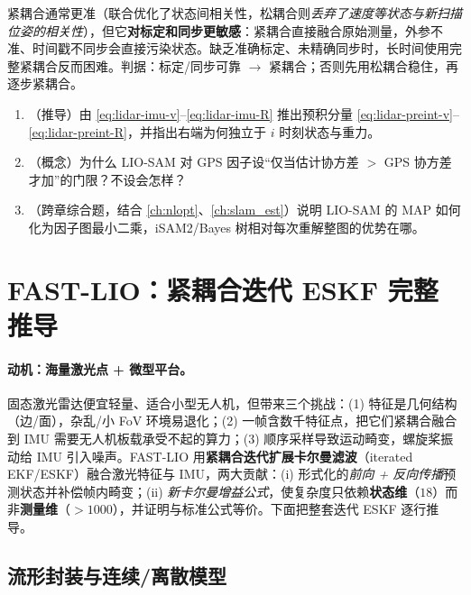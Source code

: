 \begin{pitfall}
紧耦合通常更准（联合优化了状态间相关性，松耦合则\emph{丢弃了速度等状态与新扫描位姿的相关性}），但它\textbf{对标定和同步更敏感}：紧耦合直接融合原始测量，外参不准、时间戳不同步会直接污染状态。缺乏准确标定、未精确同步时，长时间使用完整紧耦合反而困难\cite{carlone2026handbook}。判据：标定/同步可靠 $\to$ 紧耦合；否则先用松耦合稳住，再逐步紧耦合。
\end{pitfall}

\begin{practice}
\begin{enumerate}
  \item （推导）由 \cref{eq:lidar-imu-v}–\cref{eq:lidar-imu-R} 推出预积分量 \cref{eq:lidar-preint-v}–\cref{eq:lidar-preint-R}，并指出右端为何独立于 $i$ 时刻状态与重力。
  \item （概念）为什么 LIO-SAM 对 GPS 因子设“仅当估计协方差 $>$ GPS 协方差才加”的门限？不设会怎样？
  \item （跨章综合题，结合 \cref{ch:nlopt}、\cref{ch:slam_est}）说明 LIO-SAM 的 MAP 如何化为因子图最小二乘，iSAM2/Bayes 树相对每次重解整图的优势在哪。
\end{enumerate}
\end{practice}

\section{FAST-LIO：紧耦合迭代 ESKF 完整推导}
\label{sec:lidar-fastlio}

\paragraph{动机：海量激光点 + 微型平台。}
固态激光雷达便宜轻量、适合小型无人机，但带来三个挑战\cite{xu2021fastlio}：(1) 特征是几何结构（边/面），杂乱/小 FoV 环境易退化；(2) 一帧含数千特征点，把它们紧耦合融合到 IMU 需要无人机板载承受不起的算力；(3) 顺序采样导致运动畸变，螺旋桨振动给 IMU 引入噪声。FAST-LIO 用\textbf{紧耦合迭代扩展卡尔曼滤波}（iterated EKF/ESKF）融合激光特征与 IMU，两大贡献：(i) 形式化的\emph{前向 + 反向传播}预测状态并补偿帧内畸变；(ii) \emph{新卡尔曼增益公式}，使复杂度只依赖\textbf{状态维}（$18$）而非\textbf{测量维}（$>1000$），并证明与标准公式等价。下面把整套迭代 ESKF 逐行推导。

\subsection{流形封装与连续/离散模型}
\label{sec:lidar-fl-model}

